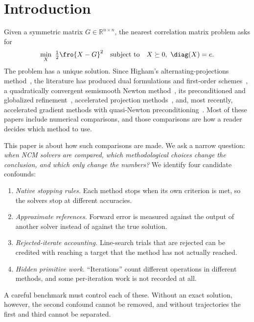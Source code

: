 \section{Introduction}\label{sec:intro}

Given a symmetric matrix $G\in\mathbb{R}^{n\times n}$, the nearest correlation
matrix problem asks for
\begin{equation}\label{eq:ncm}
  \min_{X}\ \tfrac12\fro{X-G}^2 \quad\text{subject to}\quad X\succeq 0,\ \diag(X)=e .
\end{equation}
The problem has a unique solution. Since Higham's alternating-projections
method~\cite{higham2002nearest}, the literature has produced dual formulations and
first-order schemes~\cite{malick2004dual,boyd2005least}, a quadratically convergent
semismooth Newton method~\cite{qisun2006quadratically}, its preconditioned and globalized
refinement~\cite{borsdorf2010preconditioned}, accelerated projection
methods~\cite{higham2016anderson}, and, most recently, accelerated gradient
methods with quasi-Newton preconditioning~\cite{huynh2025accelerated}. Most of these
papers include numerical comparisons, and those comparisons are how a reader
decides which method to use.

This paper is about how such comparisons are made. We ask a narrow question:
\emph{when NCM solvers are compared, which methodological choices change the
conclusion, and which only change the numbers?} We identify four candidate
confounds:
\begin{enumerate}
  \item \emph{Native stopping rules.} Each method stops when its own criterion
    is met, so the solvers stop at different accuracies.
  \item \emph{Approximate references.} Forward error is measured against the
    output of another solver instead of against the true solution.
  \item \emph{Rejected-iterate accounting.} Line-search trials that are
    rejected can be credited with reaching a target that the method has not
    actually reached.
  \item \emph{Hidden primitive work.} ``Iterations'' count different
    operations in different methods, and some per-iteration work is not
    recorded at all.
\end{enumerate}
A careful benchmark must control each of these. Without an exact solution,
however, the second confound cannot be removed, and without trajectories the
first and third cannot be separated.

